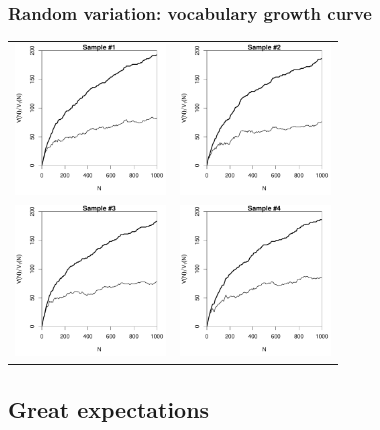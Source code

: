\documentclass[handout,notes=show,t]{beamer} %
\begin{document}
\begin{frame}
  \frametitle{Random variation: vocabulary growth curve}

  \ungap[1]
  \begin{center}
    \begin{tabular}{cc}
      \includegraphics[width=40mm]{img/02-samples-vgc-1} &
      \includegraphics[width=40mm]{img/02-samples-vgc-2} \\
      \includegraphics[width=40mm]{img/02-samples-vgc-3} &
      \includegraphics[width=40mm]{img/02-samples-vgc-4} 
    \end{tabular}
  \end{center}
\end{frame}

\subsection{Great expectations}
\end{document}
